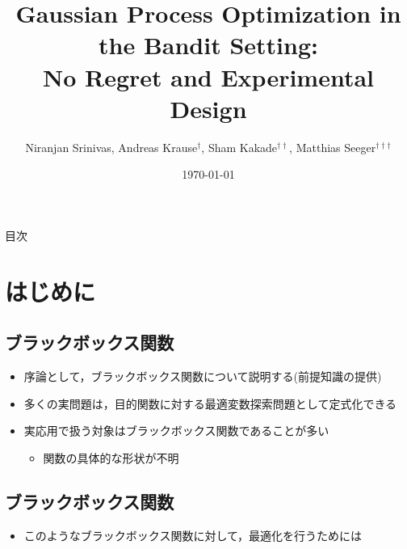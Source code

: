 \documentclass[dvipdfmx, 10.5pt]{beamer}
\title[]{Gaussian Process Optimization in the Bandit Setting:\\No Regret and Experimental Design}
\subtitle{}
\author[]{Niranjan Srinivas, Andreas Krause$^{\dag}$, Sham Kakade$^{\dag\dag}$, Matthias Seeger$^{\dag\dag\dag}$}
\date[\today]{\today}
\institute[]{$\dag$: California Institute of Technology\\
$\dag\dag$: University of Pennsylvania\\
$\dag\dag\dag$: Saarland University}
\begin{document}

\begin{frame}
\maketitle%
\thispagestyle{empty}%
\end{frame}



\begin{frame}[noframenumbering]{目次}
	\tableofcontents[hideallsubsections]
	\thispagestyle{empty} %
\end{frame}

\section{はじめに}

\subsection{ブラックボックス関数}
\begin{frame}{\insertsubsection}
	\begin{itemize}
		\item 序論として，ブラックボックス関数について説明する(前提知識の提供)
		\item 多くの実問題は，目的関数に対する最適変数探索問題として定式化できる
		\item 実応用で扱う対象はブラックボックス関数であることが多い
		\begin{itemize}
			\item 関数の具体的な形状が不明
		\end{itemize}
	\end{itemize}
\end{frame}


\subsection{ブラックボックス関数}
\begin{frame}{\insertsubsection}
	\begin{itemize}
		\item このようなブラックボックス関数に対して，最適化を行うためには
	\end{itemize}
\end{frame}
\end{document}
